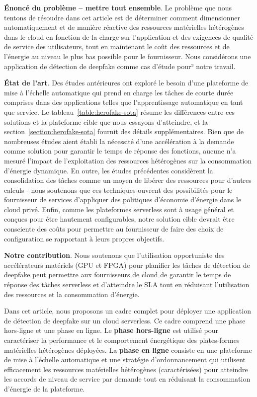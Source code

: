 \textbf{Énoncé du problème -- mettre tout ensemble}. Le problème que nous tentons de résoudre dans cet article est de déterminer comment dimensionner automatiquement et de manière réactive des ressources matérielles hétérogènes dans le cloud en fonction de la charge sur l'application et des exigences de qualité de service des utilisateurs, tout en maintenant le coût des ressources et de l'énergie au niveau le plus bas possible pour le fournisseur. Nous considérons une application de détection de deepfake comme cas d'étude pour² notre travail.

\textbf{État de l'art}. Des études antérieures ont exploré le besoin d'une plateforme de mise à l'échelle automatique qui prend en charge les tâches de courte durée comprises dans des applications telles que l'apprentissage automatique en tant que service. Le tableau~\ref{table:herofake-sota} résume les différences entre ces solutions et la plateforme cible que nous essayons d'atteindre, et la section~\ref{section:herofake-sota} fournit des détails supplémentaires. Bien que de nombreuses études aient établi la nécessité d'une accélération à la demande comme solution pour garantir le temps de réponse des fonctions, aucune n'a mesuré l'impact de l'exploitation des ressources hétérogènes sur la consommation d'énergie dynamique. En outre, les études précédentes considèrent la consolidation des tâches comme un moyen de libérer des ressources pour d'autres calculs - nous soutenons que ces techniques ouvrent des possibilités pour le fournisseur de services d'appliquer des politiques d'économie d'énergie dans le cloud privé. Enfin, comme les plateformes serverless sont à usage général et conçues pour être hautement configurables, notre solution cible devrait être consciente des coûts pour permettre au fournisseur de faire des choix de configuration se rapportant à leurs propres objectifs.

\textbf{Notre contribution}. Nous soutenons que l'utilisation opportuniste des accélérateurs matériels (GPU et FPGA) pour planifier les tâches de détection de deepfake peut permettre aux fournisseurs de cloud de garantir le temps de réponse des tâches serverless et d'atteindre le SLA tout en réduisant l'utilisation des ressources et la consommation d'énergie.

Dans cet article, nous proposons un cadre complet pour déployer une application de détection de deepfake sur un cloud serverless. Ce cadre comprend une phase hors-ligne et une phase en ligne. Le \textbf{phase hors-ligne} est utilisé pour caractériser la performance et le comportement énergétique des plates-formes matérielles hétérogènes déployées. La \textbf{phase en ligne} consiste en une plateforme de mise à l'échelle automatique et une stratégie d'ordonnancement qui utilisent efficacement les ressources matérielles hétérogènes (caractérisées) pour atteindre les accords de niveau de service par demande tout en réduisant la consommation d'énergie de la plateforme. 

